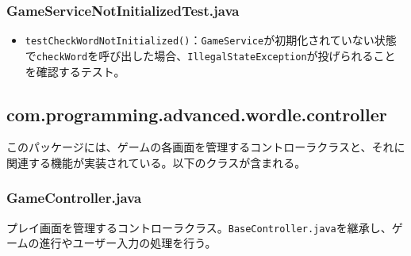 \documentclass[a4j]{ujarticle}
\begin{document}
\subsubsection{GameServiceNotInitializedTest.java}

\begin{itemize}
  \item \texttt{testCheckWordNotInitialized()}：\texttt{GameService}が初期化されていない状態で\texttt{checkWord}を呼び出した場合、\texttt{IllegalStateException}が投げられることを確認するテスト。
\end{itemize}

\subsection{com.programming.advanced.wordle.controller}
このパッケージには、ゲームの各画面を管理するコントローラクラスと、それに関連する機能が実装されている。以下のクラスが含まれる。

\subsubsection{GameController.java}
プレイ画面を管理するコントローラクラス。\texttt{BaseController.java}を継承し、ゲームの進行やユーザー入力の処理を行う。
\end{document}
